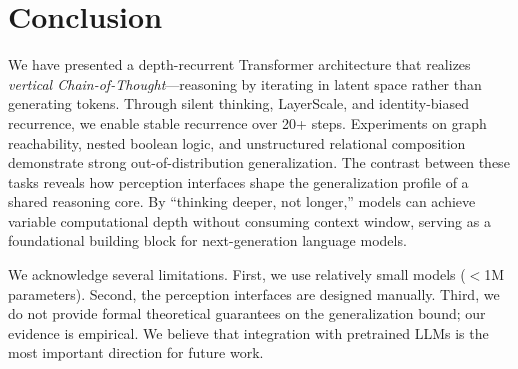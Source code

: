\section{Conclusion}
\label{sec:conclusion}
 
We have presented a depth-recurrent Transformer architecture that realizes \emph{vertical Chain-of-Thought}---reasoning by iterating in latent space rather than generating tokens. Through silent thinking, LayerScale, and identity-biased recurrence, we enable stable recurrence over 20+ steps. Experiments on graph reachability, nested boolean logic, and unstructured relational composition demonstrate strong out-of-distribution generalization. The contrast between these tasks reveals how perception interfaces shape the generalization profile of a shared reasoning core. By ``thinking deeper, not longer,'' models can achieve variable computational depth without consuming context window, serving as a foundational building block for next-generation language models.

 
We acknowledge several limitations. First, we use relatively small models ({$<$}1M parameters). Second, the perception interfaces are designed manually. Third, we do not provide formal theoretical guarantees on the generalization bound; our evidence is empirical. We believe that integration with pretrained LLMs is the most important direction for future work.
